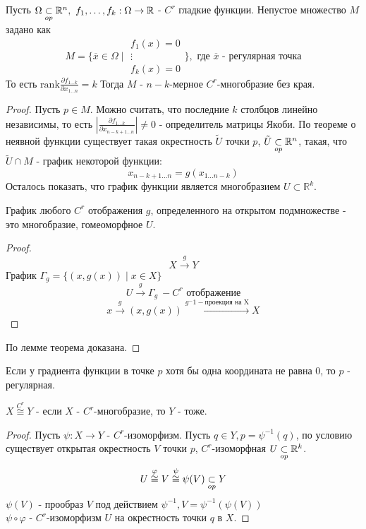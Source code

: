 \begin{theorem*}
    Пусть $\Omega \underset{op}{\subset} \mathbb{R}^n, \ f_1, \hdots, f_k: \Omega \to \mathbb{R}$ - $C^r$ гладкие функции.
    Непустое множество $M$ задано как 
    \[M = \{\overline{x} \in \Omega \mid 
    \begin{array}{c}
        f_1(x) = 0 \\
        \vdots \\
        f_k(x) = 0
    \end{array}\}, \text{ где $\overline{x}$ - регулярная точка}\]
    То есть $\mathrm{rank} \frac{\partial f_{1 \hdots k}}{\partial x_{1 \hdots n}} = k$
    Тогда $M$ - $n-k$-мерное $C^r$-многобразие без края.

    \begin{proof}
        Пусть $p \in M$. Можно считать, что последние $k$ столбцов линейно независимы, то есть $\left| \frac{\partial f_{1\hdots k}}{\partial x_{n-k+1 \hdots n}}\right| \neq 0$ - определитель матрицы Якоби.  
        По теореме о неявной функции существует такая окрестность $\tilde{U}$ точки $p$, $\tilde{U} \underset{op}{\subset} \mathbb{R}^n$, такая, что $\tilde{U} \cap M$ - график некоторой функции:
        \[x_{n-k+1 \hdots n} = g(x_{1 \hdots n-k})\]
        Осталось показать, что график функции является многобразием $U \subset \mathbb{R}^k$.
        \begin{lemma*}
            График любого $C^r$ отображения $g$, определенного на открытом подмножестве - это многобразие, гомеоморфное $U$.
            \begin{proof}
                \[X \overset{g}{\to} Y\]
                График $\Gamma_g = \{(x, g(x)) \mid x \in X\}$
                \[U \overset{g}{\to} \Gamma_g \ - C^r \text{ отображение}\]
                \[x \overset{g}{\to} (x, g(x)) \overset{g^-1 - \text{проекция на X}}{\to} X\]
            \end{proof}
        \end{lemma*}
        По лемме теорема доказана.
    \end{proof}
\end{theorem*}

\begin{note}
    Если у градиента функции в точке $p$ хотя бы одна координата не равна $0$, то $p$ - регулярная.
\end{note}

\begin{statement*}
    $X \overset{C^r}{\cong} Y$ - если $X$ - $C^r$-многобразие, то $Y$ - тоже.
    \begin{proof}
        Пусть $\psi: X \to Y$ - $C^r$-изоморфизм. Пусть $q\in Y, p = \psi^{-1}(q)$, по условию существует открытая
        окрестность $V$ точки $p$, $C^r$-изоморфная $U \underset{op}{\subset} \mathbb{R}^k$. 
        \[U \overset{\varphi}{\cong} V \overset{\psi}{\cong} \psi(V) \underset{op}{\subset} Y\]
        $\psi(V)$ - прообраз $V$ под действием $\psi^{-1}, V = \psi^{-1}(\psi(V))$\\
        $\psi \circ \varphi$ - $C^r$-изоморфизм $U$ на окрестность точки $q$ в $X$.
    \end{proof}
\end{statement*}

